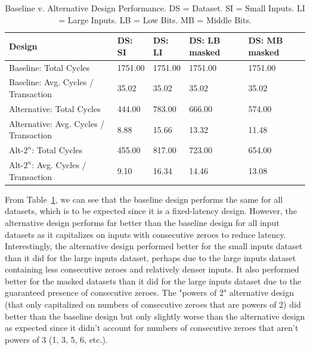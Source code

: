 \documentclass[10pt]{article}
\begin{document}
\begin{table}[h]
\begin{tabular} {p{2cm} | p{3cm} | p{3cm} | p{3cm} | p{3cm} }

\hline
\textbf{Design}    & \textbf{DS: SI} & \textbf{DS: LI} & \textbf{DS: LB masked} & \textbf{DS: MB masked} \\
\hline
Baseline:    Total Cycles                 & 1751.00                        & 1751.00                        & 1751.00                 & 1751.00 \\
Baseline:    Avg. Cycles / Transaction    & 35.02                          & 35.02                          & 35.02                   & 35.02   \\
Alternative: Total Cycles                 & 444.00                         & 783.00                         & 666.00                  & 574.00  \\
Alternative: Avg. Cycles / Transaction    & 8.88                           & 15.66                          & 13.32                   & 11.48   \\
Alt-$2^n$:	Total Cycles                  & 455.00				           & 817.00                         & 723.00 			      & 654.00  \\
Alt-$2^n$:  Avg. Cycles / Transaction     & 9.10  	                       & 16.34                          & 14.46					  & 13.08   \\
\hline                    
\end{tabular}
\caption{Baseline v. Alternative Design Performance. DS = Dataset. SI = Small Inputs. LI = Large Inputs. LB = Low Bits. MB = Middle Bits.}
\label{tab:cycles}
\end{table}


From Table~\ref{tab:cycles}, we can see that the baseline design performs the same for all datasets, which is to be expected since it is a fixed-latency design. However, the alternative design performs far better than the baseline design for all input datasets as it capitalizes on inputs with consecutive zeroes to reduce latency. Interestingly, the alternative design performed better for the small inputs dataset than it did for the large inputs dataset, perhaps due to the large inputs dataset containing less consecutive zeroes and relatively denser inputs. It also performed better for the masked datasets than it did for the large inputs dataset due to the guaranteed presence of consecutive zeroes. The "powers of 2" alternative design (that only capitalized on numbers of consecutive zeroes that are powers of 2) did better than the baseline design but only slightly worse than the alternative design as expected since it didn't account for numbers of consecutive zeroes that aren't powers of 3 (1, 3, 5, 6, etc.). 
\end{document}
